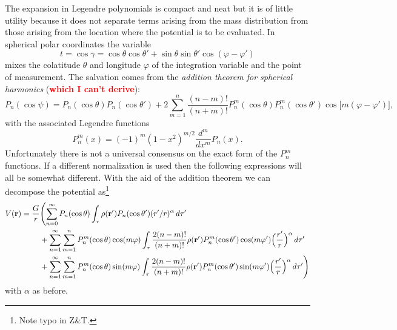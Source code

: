 \documentclass[amsmath,amsfonts,rmp,letterpaper]{revtex4}
\newcommand{\V}[1]{\mathbf{#1}} %
\newcommand{\arr}{\V{r}}
\newcommand{\arp}{\V{r'}}
\newcommand{\red}[1]{\textbf{\textcolor{red}{#1}}}
\begin{document}
The expansion in Legendre polynomials is compact and neat but it is of little
utility because it does not separate terms arising from the mass distribution from
those arising from the location where the potential is to be evaluated. In
spherical polar coordinates the variable
\begin{equation*}
t = \cos\gamma = \cos\theta\cos\theta' + \sin\theta\sin\theta'\cos(\varphi -
\varphi')
\end{equation*}
mixes the colatitude $\theta$ and longitude $\varphi$ of the integration
variable and the point of measurement. The salvation comes from the \emph{addition
theorem for spherical harmonics} (\red{which I can't derive}):
\begin{equation}\label{eq:addition}
P_n(\cos\psi) = P_n(\cos\theta)P_n(\cos\theta') +
2\sum_{m=1}^{n}\frac{(n - m)!}{(n + m)!}P_n^m(\cos\theta)P_n^m(\cos\theta')
\cos\bigl[m(\varphi - \varphi')\bigr],
\end{equation}
with the associated Legendre functions
\begin{equation}\label{eq:assoc_lege}
P_n^m(x) = (-1)^m(1 - x^2)^{m/2}\frac{d^m}{dx^m}P_n(x).
\end{equation}
Unfortunately there is not a universal consensus on the exact form of the $P_n^m$
functions. If a different normalization is used then the following expressions
will all be somewhat different. With the aid of the addition theorem we can
decompose the potential as\WarningsOff\footnote{Note typo in Z\&T.}\WarningsOn
\begin{equation}\label{eq:spherical_gravity}
\begin{split}
V(\arr) = \frac{G}{r}&\Biggl(
\sum_{n=0}^\infty{}P_n(\cos\theta)\int_\tau{}\rho(\arp)P_n(\cos\theta')
(r'/r)^\alpha\,d\tau' \\
&+ \sum_{n=1}^{\infty}\sum_{m=1}^{n}P_n^m(\cos\theta)\cos(m\varphi)\int_\tau\frac
{2(n - m)!}{(n + m)!}\rho(\arp)P_n^m(\cos\theta')\cos(m\varphi')\Bigl(\frac
{r'}{r}\Bigr)^\alpha\,d\tau' \\
&+ \sum_{n=1}^{\infty}\sum_{m=1}^{n}P_n^m(\cos\theta)\sin(m\varphi)\int_\tau\frac
{2(n - m)!}{(n + m)!}\rho(\arp)P_n^m(\cos\theta')\sin(m\varphi')\Bigl(\frac
{r'}{r}\Bigr)^\alpha\,d\tau'
\Biggr)
\end{split}
\end{equation}
with $\alpha$ as before.
\end{document}
